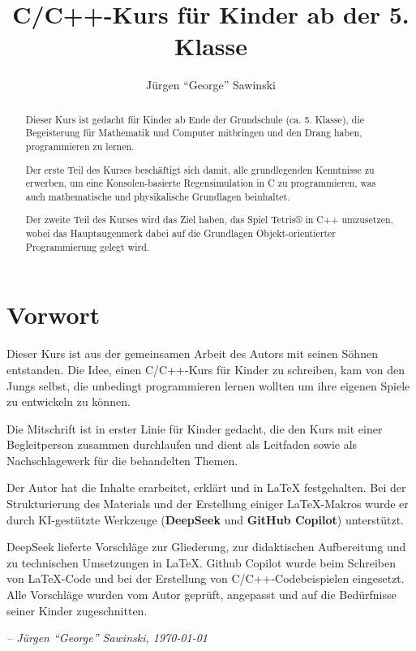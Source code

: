\documentclass[a4paper]{article}
\title{C/C++-Kurs für Kinder ab der 5. Klasse}
\author{Jürgen ``George'' Sawinski}
\begin{document}
\maketitle

    \begin{abstract}\noindent
    Dieser Kurs ist gedacht für Kinder ab Ende der Grundschule (ca. 5. Klasse), 
    die Begeisterung für Mathematik und Computer mitbringen und den Drang haben, 
    programmieren zu lernen.

    Der erste Teil des Kurses beschäftigt sich damit, alle grundlegenden Kenntnisse zu erwerben, um eine Konsolen-basierte Regensimulation in C zu programmieren, was auch mathematische und physikalische Grundlagen beinhaltet.

    Der zweite Teil des Kurses wird das Ziel haben, das Spiel Tetris® in C++ umzusetzen, wobei das Hauptaugenmerk dabei auf die Grundlagen Objekt-orientierter Programmierung gelegt wird.
    \end{abstract}

\tableofcontents

\newpage
\section*{Vorwort}

Dieser Kurs ist aus der gemeinsamen Arbeit des Autors mit seinen Söhnen entstanden.
Die Idee, einen C/C++-Kurs für Kinder zu schreiben, kam von den Jungs selbst,
die unbedingt programmieren lernen wollten um ihre eigenen Spiele zu entwickeln
zu können. 

Die Mitschrift ist in erster Linie für Kinder gedacht, die den Kurs mit einer 
Begleitperson zusammen durchlaufen und dient als Leitfaden sowie als 
Nachschlagewerk für die behandelten Themen. 

Der Autor hat die Inhalte erarbeitet, erklärt und in LaTeX festgehalten.
Bei der Strukturierung des Materials und der Erstellung einiger LaTeX-Makros
wurde er durch KI-gestützte Werkzeuge (\textbf{DeepSeek} und \textbf{GitHub Copilot}) 
unterstützt.

DeepSeek lieferte Vorschläge zur Gliederung, zur didaktischen Aufbereitung
und zu technischen Umsetzungen in LaTeX. Github Copilot wurde beim Schreiben von 
LaTeX-Code und bei der Erstellung von C/C++-Codebeispielen eingesetzt. Alle 
Vorschläge wurden vom Autor geprüft, angepasst und auf die Bedürfnisse seiner 
Kinder zugeschnitten.

\textit{-- Jürgen ``George'' Sawinski, \today}
\end{document}
